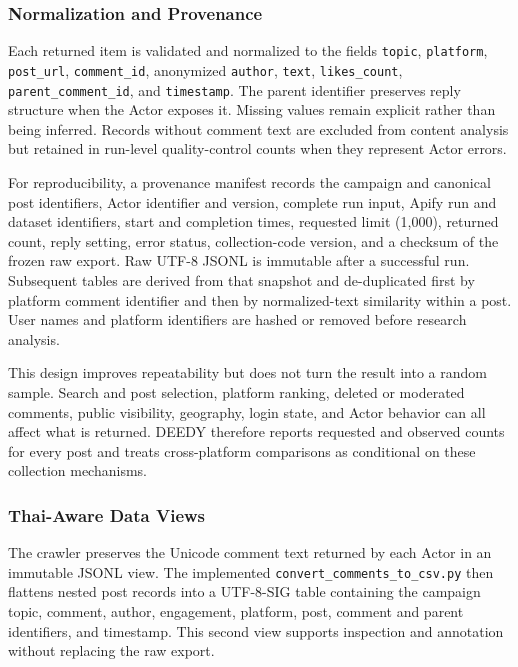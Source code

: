 \documentclass[conference]{IEEEtran}
\begin{document}
\subsubsection{Normalization and Provenance}

Each returned item is validated and normalized to the fields
\texttt{topic}, \texttt{platform}, \texttt{post\_url},
\texttt{comment\_id}, anonymized \texttt{author}, \texttt{text},
\texttt{likes\_count}, \texttt{parent\_comment\_id}, and \texttt{timestamp}.
The parent identifier preserves reply structure when the Actor exposes it.
Missing values remain explicit rather than being inferred. Records without
comment text are excluded from content analysis but retained in run-level
quality-control counts when they represent Actor errors.

For reproducibility, a provenance manifest records the campaign and canonical
post identifiers, Actor identifier and version, complete run input, Apify run
and dataset identifiers, start and completion times, requested limit
(1,000), returned count, reply setting, error status, collection-code version,
and a checksum of the frozen raw export. Raw UTF-8 JSONL is immutable after a
successful run. Subsequent tables are derived from that snapshot and
de-duplicated first by platform comment identifier and then by normalized-text
similarity within a post. User names and platform identifiers are hashed or
removed before research analysis.

This design improves repeatability but does not turn the result into a random
sample. Search and post selection, platform ranking, deleted or moderated
comments, public visibility, geography, login state, and Actor behavior can all
affect what is returned. DEEDY therefore reports requested and observed counts
for every post and treats cross-platform comparisons as conditional on these
collection mechanisms.

\subsubsection{Thai-Aware Data Views}

The crawler preserves the Unicode comment text returned by each Actor in an
immutable JSONL view. The implemented
\texttt{convert\_comments\_to\_csv.py} then flattens nested post records into a
UTF-8-SIG table containing the campaign topic, comment, author, engagement,
platform, post, comment and parent identifiers, and timestamp. This second view
supports inspection and annotation without replacing the raw export.
\end{document}
